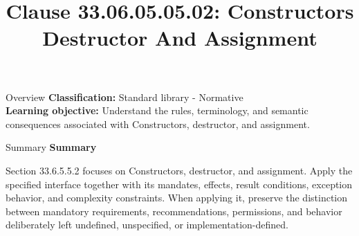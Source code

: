 \documentclass[10pt,letterpaper]{article}
\title{Clause 33.06.05.05.02: Constructors Destructor And Assignment}
\author{}
\date{}
\begin{document}
\maketitle
\begin{CornellOverviewBox}{Overview}
\textbf{Classification:} Standard library - Normative\\[2pt]
\textbf{Learning objective:} Understand the rules, terminology, and semantic consequences associated with Constructors, destructor, and assignment.
\end{CornellOverviewBox}\begin{CornellSummaryBox}{Summary}
{\sffamily\bfseries\color{Accent} Summary}\par\vspace{3pt}Section 33.6.5.5.2 focuses on Constructors, destructor, and assignment. Apply the specified interface together with its mandates, effects, result conditions, exception behavior, and complexity constraints. When applying it, preserve the distinction between mandatory requirements, recommendations, permissions, and behavior deliberately left undefined, unspecified, or implementation-defined.
\end{CornellSummaryBox}
\end{document}
